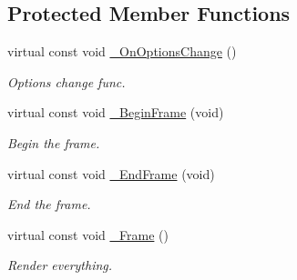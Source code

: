 \subsection*{Protected Member Functions}
\begin{DoxyCompactItemize}
\item 
virtual const void \hyperlink{class_ensum_1_1_graphics_1_1_d3_d11_aaa1f9118226ed14729d1d1ad450ec10d}{\+\_\+\+On\+Options\+Change} ()\hypertarget{class_ensum_1_1_graphics_1_1_d3_d11_aaa1f9118226ed14729d1d1ad450ec10d}{}\label{class_ensum_1_1_graphics_1_1_d3_d11_aaa1f9118226ed14729d1d1ad450ec10d}

\begin{DoxyCompactList}\small\item\em Options change func. \end{DoxyCompactList}\item 
virtual const void \hyperlink{class_ensum_1_1_graphics_1_1_d3_d11_afea086dc974d70437a9c415473233c38}{\+\_\+\+Begin\+Frame} (void)\hypertarget{class_ensum_1_1_graphics_1_1_d3_d11_afea086dc974d70437a9c415473233c38}{}\label{class_ensum_1_1_graphics_1_1_d3_d11_afea086dc974d70437a9c415473233c38}

\begin{DoxyCompactList}\small\item\em Begin the frame. \end{DoxyCompactList}\item 
virtual const void \hyperlink{class_ensum_1_1_graphics_1_1_d3_d11_a5a64baccb2481676a72de24548f03728}{\+\_\+\+End\+Frame} (void)\hypertarget{class_ensum_1_1_graphics_1_1_d3_d11_a5a64baccb2481676a72de24548f03728}{}\label{class_ensum_1_1_graphics_1_1_d3_d11_a5a64baccb2481676a72de24548f03728}

\begin{DoxyCompactList}\small\item\em End the frame. \end{DoxyCompactList}\item 
virtual const void \hyperlink{class_ensum_1_1_graphics_1_1_d3_d11_a234588ad9a96acd36260f766e5b7f839}{\+\_\+\+Frame} ()\hypertarget{class_ensum_1_1_graphics_1_1_d3_d11_a234588ad9a96acd36260f766e5b7f839}{}\label{class_ensum_1_1_graphics_1_1_d3_d11_a234588ad9a96acd36260f766e5b7f839}

\begin{DoxyCompactList}\small\item\em Render everything. \end{DoxyCompactList}\end{DoxyCompactItemize}
